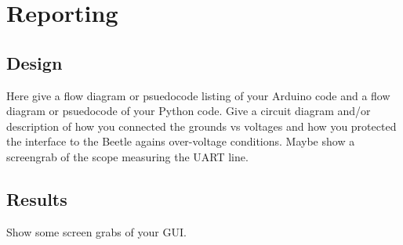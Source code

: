 \chapter{Reporting} \label{ch:reporting}

\section{Design} \label{sec:rep_design}
Here give a flow diagram or psuedocode listing of your Arduino code and a flow diagram or psuedocode of your Python code. 
Give a circuit diagram and/or description of how you connected the grounds vs voltages and how you protected the interface to the Beetle agains over-voltage conditions. 
Maybe show a screengrab of the scope measuring the UART line. 

\section{Results} \label{sec:rep_results}
Show some screen grabs of your GUI. 




